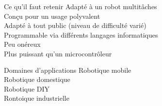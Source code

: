 \documentclass{beamer}
\begin{document}
\begin{frame}
\begin{alertblock}{Ce qu'il faut retenir}
Adapté à un robot multitâches\\
Conçu pour un usage polyvalent\\
Adapté à tout public (niveau de difficulté varié)\\
Programmable via différents langages informatiques\\
Peu onéreux\\
Plus puissant qu'un microcontrôleur
\end{alertblock}
\begin{exampleblock}{Domaines d'applications}
Robotique mobile\\
Robotique domestique\\
Robotique DIY\\
Rontoique industrielle
\end{exampleblock}
\end{frame}
\end{document}
